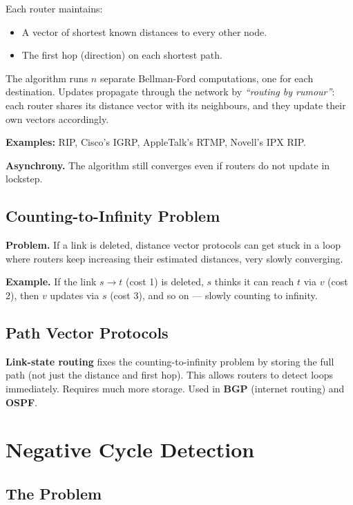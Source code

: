 \documentclass[12pt,a4paper]{report}
\begin{document}
Each router maintains:
\begin{itemize}
    \item A vector of shortest known distances to every other node.
    \item The first hop (direction) on each shortest path.
\end{itemize}

The algorithm runs $n$ separate Bellman-Ford computations, one for each destination.
Updates propagate through the network by \emph{``routing by rumour''}: each router shares
its distance vector with its neighbours, and they update their own vectors accordingly.

\textbf{Examples:} RIP, Cisco's IGRP, AppleTalk's RTMP, Novell's IPX RIP.

\textbf{Asynchrony.} The algorithm still converges even if routers do not update in lockstep.

\subsection{Counting-to-Infinity Problem}

\textbf{Problem.} If a link is deleted, distance vector protocols can get stuck in a loop
where routers keep increasing their estimated distances, very slowly converging.

\textbf{Example.} If the link $s \to t$ (cost 1) is deleted, $s$ thinks it can reach $t$
via $v$ (cost 2), then $v$ updates via $s$ (cost 3), and so on — slowly counting to infinity.

\subsection{Path Vector Protocols}

\textbf{Link-state routing} fixes the counting-to-infinity problem by storing the full path
(not just the distance and first hop). This allows routers to detect loops immediately.
Requires much more storage. Used in \textbf{BGP} (internet routing) and \textbf{OSPF}.

\section{Negative Cycle Detection}

\subsection{The Problem}
\end{document}
